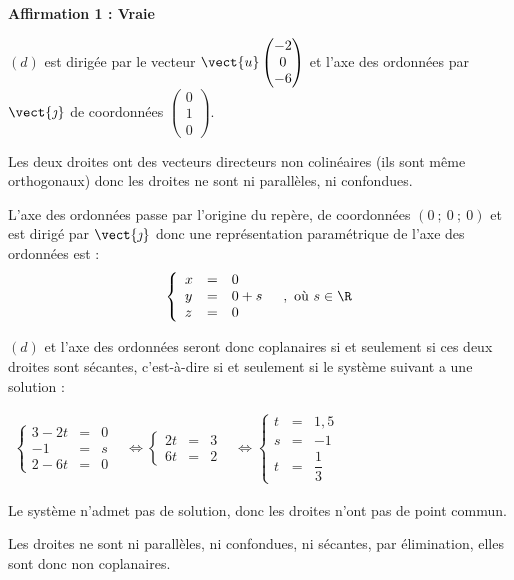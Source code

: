 \medskip

\textbf{Affirmation 1 : Vraie}

$(d)$ est dirigée par le vecteur $\vect{u}\begin{pmatrix}-2\\0\\-6\end{pmatrix}$ et l'axe des ordonnées par $\vect{\jmath}$ de coordonnées $\begin{pmatrix} 0\\1\\0\end{pmatrix}$.

Les deux droites ont des vecteurs directeurs non colinéaires (ils sont même orthogonaux) donc les droites ne sont ni parallèles, ni confondues.

L'axe des ordonnées passe par l'origine du repère, de coordonnées $(0~;~0~;~0)$ et est dirigé par $\vect{\jmath}$ donc une représentation paramétrique de l'axe des ordonnées est :
\[\left\{\begin{array}{l c l}
x&=&0 \\
y&=&0 + s \\
z&=&0
\end{array} \quad, \text { où } s \in \R\right.\]

$(d)$ et l'axe des ordonnées seront donc coplanaires si et seulement si ces deux droites sont sécantes, c'est-à-dire si et seulement si le système suivant a une solution :

$\begin{aligned}
\left\{\begin{array}{lcl}
3-2t&=&0 \\
-1&=&s\\
2-6t&=&0
\end{array}\right.
	&\iff
\left\{\begin{array}{lcl}
2t&=&3 \\
6t&=&2
\end{array}\right.
	&\iff
\left\{\begin{array}{lcl}
t&=&1,5 \\
s&=&-1\\
t&=&\dfrac{1}{3}
\end{array}\right.
\end{aligned}$

Le système n'admet pas de solution, donc les droites n'ont pas de point commun.

Les droites ne sont ni parallèles, ni confondues, ni sécantes, par élimination, elles sont donc non coplanaires.

